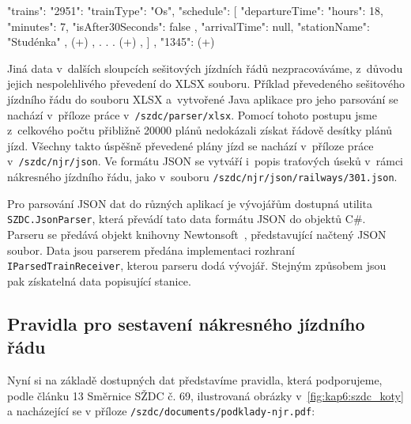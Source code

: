 \begin{csharpcode}
{ "trains": {
  "2951": {
	"trainType": "Os",
    "schedule": [
      {
        "departureTime": {
          "hours": 18,
          "minutes": 7,
          "isAfter30Seconds": false
        },
        "arrivalTime": null,
        "stationName": "Studénka"
      },
      { (+) },
      .
      .
      .
	  { (+) },
      ]
   },
   "1345": { (+) }
}
}
\end{csharpcode}

Jiná data v~dalších sloupcích sešitových jízdních řádů nezpracováváme, z~důvodu jejich nespolehlivého převedení do XLSX souboru. Příklad převedeného sešitového jízdního řádu do souboru XLSX a~vytvořené Java aplikace pro jeho parsování se nachází v~příloze práce v~\texttt{/szdc/parser/xlsx}. Pomocí tohoto postupu jsme z~celkového počtu přibližně 20000 plánů nedokázali získat řádově desítky plánů jízd. Všechny takto úspěšně převedené plány jízd se nachází v~příloze práce v~\texttt{/szdc/njr/json}. Ve formátu JSON se vytváří i~popis traťových úseků v~rámci nákresného jízdního řádu, jako v~souboru \texttt{/szdc/njr/json/railways/301.json}.

Pro parsování JSON dat do různých aplikací je vývojářům dostupná utilita \texttt{SZDC.JsonParser}, která převádí tato data formátu JSON do objektů C\#. Parseru se předává objekt knihovny Newtonsoft~\cite{Newtonsoft}, představující načtený JSON soubor. Data jsou parserem předána implementaci rozhraní \texttt{IParsedTrainReceiver}, kterou parseru dodá vývojář. Stejným způsobem jsou pak získatelná data popisující stanice.

\subsection*{Pravidla pro sestavení nákresného jízdního řádu}
Nyní si na základě dostupných dat představíme pravidla, která podporujeme, podle článku 13 Směrnice SŽDC č. 69, ilustrovaná obrázky v~\ref{fig:kap6:szdc_koty} a nacházející se v příloze \texttt{/szdc/documents/podklady-njr.pdf}:

